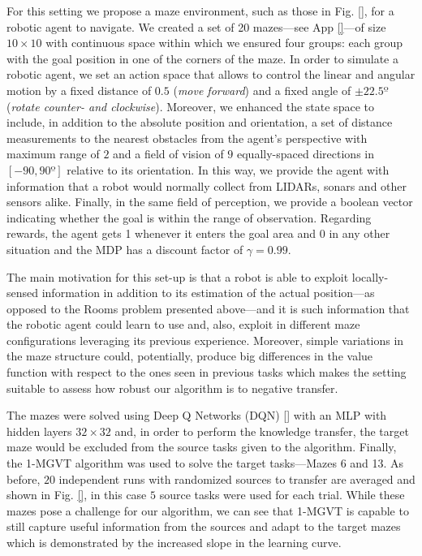 \documentclass{article}
\begin{document}
For this setting we propose a maze environment, such as those in Fig. \ref{}, for a robotic agent to navigate. We created a set of 20 mazes---see App \ref{}---of size $10\times10$ with continuous space within which we ensured four groups: each group with the goal position in one of the corners of the maze. In order to simulate a robotic agent, we set an action space that allows to control the linear and angular motion by a fixed distance of $0.5$ (\emph{move forward}) and a fixed angle of $\pm 22.5º$ (\emph{rotate counter- and clockwise}). Moreover, we enhanced the state space to include, in addition to the absolute position and orientation, a set of distance measurements to the nearest obstacles from the agent's perspective with maximum range of $2$ and a field of vision of $9$ equally-spaced directions in $[-90,90º]$ relative to its orientation. In this way, we provide the agent with information that a robot would normally collect from LIDARs, sonars and other sensors alike. Finally, in the same field of perception, we provide a boolean vector indicating whether the goal is within the range of observation. Regarding rewards, the agent gets 1 whenever it enters the goal area and 0 in any other situation and the MDP has a discount factor of $\gamma = 0.99$.

The main motivation for this set-up is that a robot is able to exploit locally-sensed information in addition to its estimation of the actual position---as opposed to the Rooms problem presented above---and it is such information that the robotic agent could learn to use and, also, exploit in different maze configurations leveraging its previous experience. Moreover, simple variations in the maze structure could, potentially, produce big differences in the value function with respect to the ones seen in previous tasks which makes the setting suitable to assess how robust our algorithm is to negative transfer.

The mazes were solved using Deep Q Networks (DQN) []  with an MLP with hidden layers $32\times32$ and, in order to perform the knowledge transfer, the target maze would be excluded from the source tasks given to the algorithm. Finally, the 1-MGVT algorithm was used to solve the target tasks---Mazes 6 and 13. As before, $20$ independent runs with randomized sources to transfer are averaged and shown in Fig. \ref{}, in this case $5$ source tasks were used for each trial. While these mazes pose a challenge for our algorithm, we can see that 1-MGVT is capable to still capture useful information from the sources and adapt to the target mazes which is demonstrated by the increased slope in the learning curve. 
\end{document}

